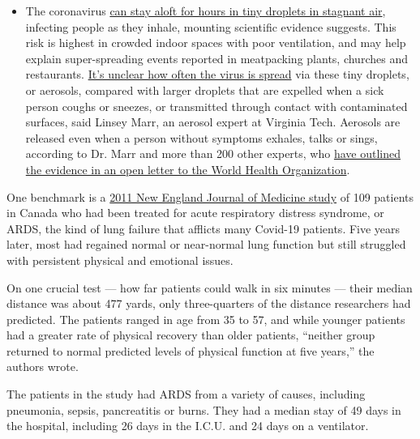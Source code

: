 \begin{itemize}
  \begin{itemize}
  \tightlist
  \item
    The coronavirus
    \href{https://www.nytimes3xbfgragh.onion/2020/07/04/health/239-experts-with-one-big-claim-the-coronavirus-is-airborne.html?action=click\&pgtype=Article\&state=default\&region=MAIN_CONTENT_3\&context=storylines_faq}{can
    stay aloft for hours in tiny droplets in stagnant air}, infecting
    people as they inhale, mounting scientific evidence suggests. This
    risk is highest in crowded indoor spaces with poor ventilation, and
    may help explain super-spreading events reported in meatpacking
    plants, churches and restaurants.
    \href{https://www.nytimes3xbfgragh.onion/2020/07/06/health/coronavirus-airborne-aerosols.html?action=click\&pgtype=Article\&state=default\&region=MAIN_CONTENT_3\&context=storylines_faq}{It's
    unclear how often the virus is spread} via these tiny droplets, or
    aerosols, compared with larger droplets that are expelled when a
    sick person coughs or sneezes, or transmitted through contact with
    contaminated surfaces, said Linsey Marr, an aerosol expert at
    Virginia Tech. Aerosols are released even when a person without
    symptoms exhales, talks or sings, according to Dr. Marr and more
    than 200 other experts, who
    \href{https://academic.oup.com/cid/article/doi/10.1093/cid/ciaa939/5867798}{have
    outlined the evidence in an open letter to the World Health
    Organization}.
  \end{itemize}
\end{itemize}

One benchmark is a
\href{https://www.nejm.org/doi/full/10.1056/nejmoa1011802}{2011 New
England Journal of Medicine study} of 109 patients in Canada who had
been treated for acute respiratory distress syndrome, or ARDS, the kind
of lung failure that afflicts many Covid-19 patients. Five years later,
most had regained normal or near-normal lung function but still
struggled with persistent physical and emotional issues.

On one crucial test --- how far patients could walk in six minutes ---
their median distance was about 477 yards, only three-quarters of the
distance researchers had predicted. The patients ranged in age from 35
to 57, and while younger patients had a greater rate of physical
recovery than older patients, ``neither group returned to normal
predicted levels of physical function at five years,'' the authors
wrote.

The patients in the study had ARDS from a variety of causes, including
pneumonia, sepsis, pancreatitis or burns. They had a median stay of 49
days in the hospital, including 26 days in the I.C.U. and 24 days on a
ventilator.

